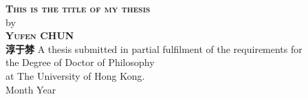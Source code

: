 

%
%
\begin{titlepage}
	\begin{center}
		\large  
	        \hfill
	        \vfill
        \begingroup
            \huge\textsc{\textbf{This is the title of my thesis}} \\
            \bigskip
        \endgroup
         by\\
	\bigskip  	
        \Large\textsc{\textbf{Yufen CHUN}}\\
						\textbf{淳于棼}
        \vfill
        \vfill
        \vfill
	{\normalsize
	A thesis submitted in partial fulfilment of the requirements for\\
	the Degree of Doctor of Philosophy\\
	at The University of Hong Kong.\\
		\bigskip
	Month Year}
        \vfill                      
    	\end{center}      
\end{titlepage}   
